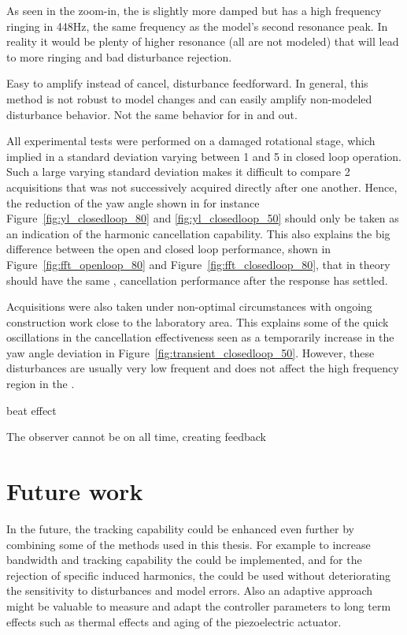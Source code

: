 As seen in the zoom-in, the \abbrIRC is slightly more damped but has a high frequency ringing in 448Hz, the same frequency as the model's second resonance peak. In reality it would be plenty of  higher resonance (all are not modeled) that will lead to more ringing and bad disturbance rejection.

Easy to amplify instead of cancel, disturbance feedforward. In general, this method is not robust to model changes and can easily amplify non-modeled disturbance behavior. Not the same behavior for in and out.


All experimental tests were performed on a damaged rotational stage, which implied in a standard deviation varying between \unit{1}{\micro\radian} and \unit{5}{\micro\radian} in closed loop operation. Such a large varying standard deviation makes it difficult to compare 2 acquisitions that was not successively acquired directly after one another. Hence, the reduction of the yaw angle shown in for instance Figure~\ref{fig:yl_closedloop_80} and \ref{fig:yl_closedloop_50} should only be taken as an indication of the harmonic cancellation capability. This also explains the big difference between the open and closed loop performance, shown in Figure~\ref{fig:fft_openloop_80} and Figure~\ref{fig:fft_closedloop_80}, that in theory should have the same , cancellation performance after the response has settled.

Acquisitions were also taken under non-optimal circumstances with ongoing construction work close to the laboratory area. This explains some of the quick oscillations in the cancellation effectiveness seen as a temporarily increase in the yaw angle deviation in Figure~\ref{fig:transient_closedloop_50}. However, these disturbances are usually very low frequent and does not affect the high frequency region in the \abbrFFT.

beat effect

The observer cannot be on all time, creating feedback


\section{Future work}
In the future, the tracking capability could be enhanced even further by combining some of the methods used in this thesis. For example to increase bandwidth and tracking capability the \abbrIRC could be implemented, and for the rejection of specific induced harmonics, the \abbrRFDC could be used without deteriorating the sensitivity to disturbances and model errors. Also an adaptive approach might be valuable to measure and adapt the controller parameters to long term effects such as thermal effects and aging of the piezoelectric actuator.

